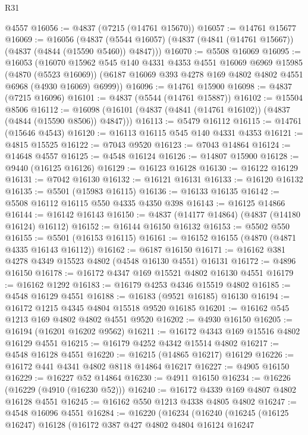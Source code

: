\begin{lexlean}{R31}
\begin{coremodule}
    @4557
@16056 := @4837 (@7215 (@14761 @15670))
@16057 := @14761 @15677
@16069 := @16056
    (@4837 (@5544 @16057) (@4837 (@4841 (@14761 @15667)) (@4837 (@4844 (@15590 @5460)) @4847)))
@16070 := @5508 @16069
@16095 := @16053
    (@16070
      @15962
      @545
      @140
      @4331
      @4353
      @4551
      @16069
      @6969
      @15985
      (@4870 (@5523 @16069))
      (@6187 @16069 @393 @4278 @169 @4802 @4802 @4551 @6968 (@4930 @16069) @6999))
@16096 := @14761 @15900
@16098 := @4837 (@7215 @16096)
@16101 := @4837 (@5544 (@14761 @15887))
@16102 := @15504 @8506
@16112 := @16098 (@16101 (@4837 (@4841 (@14761 @16102)) (@4837 (@4844 (@15590 @8506)) @4847)))
@16113 := @5479 @16112
@16115 := @14761 (@15646 @4543)
@16120 := @16113 @16115 @545 @140 @4331 @4353
@16121 := @4815 @15525
@16122 := @7043 @9520
@16123 := @7043 @14864
@16124 := @14648 @4557
@16125 := @4548 @16124
@16126 := @14807 @15900
@16128 := @9440 (@16125 @16126)
@16129 := @16123 @16128
@16130 := @16122 @16129
@16131 := @7042 @16130
@16132 := @16121 @16131
@16133 := @16120 @16132
@16135 := @5501 (@15983 @16115)
@16136 := @16133 @16135
@16142 := @5508 @16112 @16115 @550 @4335 @4350 @398
@16143 := @16125 @14866
@16144 := @16142 @16143
@16150 := @4837 (@14177 @14864) (@4837 (@14180 @16124) @16112)
@16152 := @16144 @16150 @16132
@16153 := @5502 @550
@16155 := @5501 (@16153 @16115)
@16161 := @16152 @16155 (@4870 (@4871 @4335 @16143 @16112))
@16162 := @6187 @16150
@16171 := @16162 @381 @4278 @4349 @15523 @4802 (@4548 @16130 @4551) @16131
@16172 := @4896 @16150
@16178 := @16172 @4347 @169 @15521 @4802 @16130 @4551
@16179 := @16162 @1292
@16183 := @16179 @4253 @4346 @15519 @4802
@16185 := @4548 @16129 @4551
@16188 := @16183 (@9521 @16185) @16130
@16194 := @16172 @1215 @4345 @4804 @15518 @9520 @16185
@16201 := @16162 @545 @1213 @169 @4802 @4802 @4551 @9520
@16202 := @4930 @16150
@16205 := @16194 (@16201 @16202 @9562)
@16211 := @16172 @4343 @169 @15516 @4802 @16129 @4551
@16215 := @16179 @4252 @4342 @15514 @4802
@16217 := @4548 @16128 @4551
@16220 := @16215 (@14865 @16217) @16129
@16226 := @16172 @441 @4341 @4802 @8118 @14864 @16217
@16227 := @4905 @16150
@16229 := @16227 @52 @14864
@16230 := @4911 @16150
@16234 := @16226 (@16229 (@4910 (@16230 @52)))
@16240 := @16172 @4339 @169 @4807 @4802 @16128 @4551
@16245 := @16162 @550 @1213 @4338 @4805 @4802
@16247 := @4548 @16096 @4551
@16284 := @16220
    (@16234
      (@16240
        (@16245
          (@16125 @16247)
          @16128
          (@16172
            @387
            @427
            @4802
            @4804
            @16124
            @16247

\end{coremodule}
\end{lexlean}
